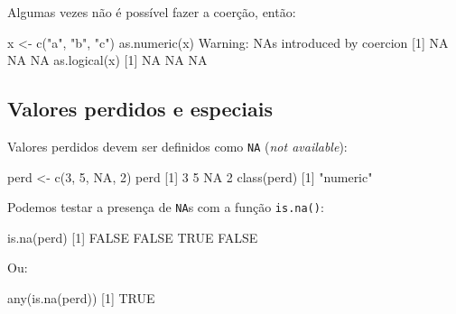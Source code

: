 \documentclass[
  10pt,
  a4paper]{book}
\newenvironment{Shaded}{\begin{snugshade}}{\end{snugshade}}
\newcommand{\ConstantTok}[1]{\textcolor[rgb]{0.00,0.00,0.00}{#1}}
\newcommand{\DecValTok}[1]{\textcolor[rgb]{0.00,0.00,0.81}{#1}}
\newcommand{\FunctionTok}[1]{\textcolor[rgb]{0.00,0.00,0.00}{#1}}
\newcommand{\NormalTok}[1]{#1}
\newcommand{\OtherTok}[1]{\textcolor[rgb]{0.56,0.35,0.01}{#1}}
\newcommand{\SpecialCharTok}[1]{\textcolor[rgb]{0.00,0.00,0.00}{#1}}
\newcommand{\StringTok}[1]{\textcolor[rgb]{0.31,0.60,0.02}{#1}}
\begin{document}
Algumas vezes não é possível fazer a coerção, então:

\begin{Shaded}
\begin{Highlighting}[]
\NormalTok{x }\OtherTok{\textless{}{-}} \FunctionTok{c}\NormalTok{(}\StringTok{"a"}\NormalTok{, }\StringTok{"b"}\NormalTok{, }\StringTok{"c"}\NormalTok{)}
\FunctionTok{as.numeric}\NormalTok{(x)}
\NormalTok{Warning}\SpecialCharTok{:}\NormalTok{ NAs introduced by coercion}
\NormalTok{[}\DecValTok{1}\NormalTok{] }\ConstantTok{NA} \ConstantTok{NA} \ConstantTok{NA}
\FunctionTok{as.logical}\NormalTok{(x)}
\NormalTok{[}\DecValTok{1}\NormalTok{] }\ConstantTok{NA} \ConstantTok{NA} \ConstantTok{NA}
\end{Highlighting}
\end{Shaded}

\hypertarget{valores-perdidos-e-especiais}{%
\subsection{Valores perdidos e especiais}\label{valores-perdidos-e-especiais}}

Valores perdidos devem ser definidos como \texttt{NA} (\emph{not available}):

\begin{Shaded}
\begin{Highlighting}[]
\NormalTok{perd }\OtherTok{\textless{}{-}} \FunctionTok{c}\NormalTok{(}\DecValTok{3}\NormalTok{, }\DecValTok{5}\NormalTok{, }\ConstantTok{NA}\NormalTok{, }\DecValTok{2}\NormalTok{)}
\NormalTok{perd}
\NormalTok{[}\DecValTok{1}\NormalTok{]  }\DecValTok{3}  \DecValTok{5} \ConstantTok{NA}  \DecValTok{2}
\FunctionTok{class}\NormalTok{(perd)}
\NormalTok{[}\DecValTok{1}\NormalTok{] }\StringTok{"numeric"}
\end{Highlighting}
\end{Shaded}

Podemos testar a presença de \texttt{NA}s com a função \texttt{is.na()}:

\begin{Shaded}
\begin{Highlighting}[]
\FunctionTok{is.na}\NormalTok{(perd)}
\NormalTok{[}\DecValTok{1}\NormalTok{] }\ConstantTok{FALSE} \ConstantTok{FALSE}  \ConstantTok{TRUE} \ConstantTok{FALSE}
\end{Highlighting}
\end{Shaded}

Ou:

\begin{Shaded}
\begin{Highlighting}[]
\FunctionTok{any}\NormalTok{(}\FunctionTok{is.na}\NormalTok{(perd))}
\NormalTok{[}\DecValTok{1}\NormalTok{] }\ConstantTok{TRUE}
\end{Highlighting}
\end{Shaded}
\end{document}
